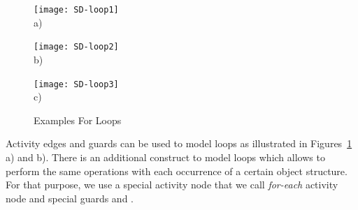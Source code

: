 \begin{figure}[htb]
	\centering
  \begin{minipage}[t]{.3\textwidth}
    \centering
    \texttt{[image: SD-loop1]} 
    \\a)
  \end{minipage}%
  \hfill
  \begin{minipage}[t]{.3\textwidth}
    \centering
    \texttt{[image: SD-loop2]}
    \\b)
  \end{minipage}
  \hfill
  \begin{minipage}[t]{.3\textwidth}
    \centering
    \texttt{[image: SD-loop3]}
    \\c)
  \end{minipage}
  \caption{Examples For Loops}
  \label{fig:SD-loops}
\end{figure}

Activity edges and guards can be used to model loops as illustrated in Figures~\ref{fig:SD-loops} a) and b).
There is an additional construct to model loops which allows to perform the same operations with each occurrence of a certain object structure.
For that purpose, we use a special activity node that we call \emph{for-each} activity node
and special guards  and .

